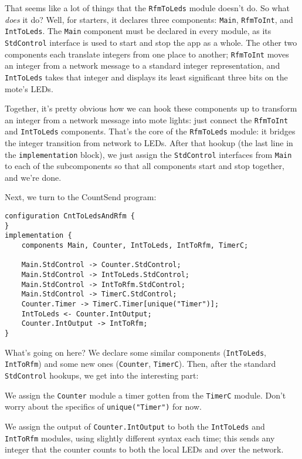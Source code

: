 \documentclass{article}
\begin{document}
That seems like a lot of things that the \verb!RfmToLeds! module doesn't do. So what \textit{does} it do? Well, for starters, it declares three components: \verb!Main!, \verb!RfmToInt!, and \verb!IntToLeds!. The \verb!Main! component must be declared in every module, as its \verb!StdControl! interface is used to start and stop the app as a whole. The other two components each translate integers from one place to another; \verb!RfmToInt! moves an integer from a network message to a standard integer representation, and \verb!IntToLeds! takes that integer and displays its least significant three bits on the mote's LEDs.

Together, it's pretty obvious how we can hook these components up to transform an integer from a network message into mote lights: just connect the \verb!RfmToInt! and \verb!IntToLeds! components. That's the core of the \verb!RfmToLeds! module: it bridges the integer transition from network to LEDs. After that hookup (the last line in the \verb!implementation! block), we just assign the \verb!StdControl! interfaces from \verb!Main! to each of the subcomponents so that all components start and stop together, and we're done.

Next, we turn to the CountSend program:

\begin{verbatim}
configuration CntToLedsAndRfm {
}
implementation {
    components Main, Counter, IntToLeds, IntToRfm, TimerC;

    Main.StdControl -> Counter.StdControl;
    Main.StdControl -> IntToLeds.StdControl;
    Main.StdControl -> IntToRfm.StdControl;
    Main.StdControl -> TimerC.StdControl;
    Counter.Timer -> TimerC.Timer[unique("Timer")];
    IntToLeds <- Counter.IntOutput;
    Counter.IntOutput -> IntToRfm;
}
\end{verbatim}

What's going on here? We declare some similar components (\verb!IntToLeds!, \verb!IntToRfm!) and some new ones (\verb!Counter!, \verb!TimerC!). Then, after the standard \verb!StdControl! hookups, we get into the interesting part:

\begin{itemize*}
\item We assign the \verb!Counter! module a timer gotten from the \verb!TimerC! module. Don't worry about the specifics of \verb!unique("Timer")! for now.
\item We assign the output of \verb!Counter.IntOutput! to both the \verb!IntToLeds! and \verb!IntToRfm! modules, using slightly different syntax each time; this sends any integer that the counter counts to both the local LEDs and over the network.
\end{itemize*}
\end{document}
